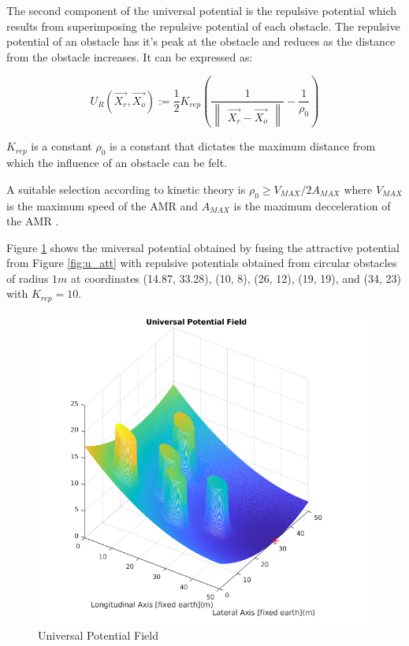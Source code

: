 \documentclass[a4paper, twocolumn]{article}
\begin{document}
The second component of the universal potential is the repulsive potential which results from superimposing 
the repulsive potential of each obstacle. The repulsive potential of an obstacle has it's peak at the obstacle and reduces as the 
distance from the obstacle increases. It can be expressed as:

$$
U_{R}(\vec{X_{r}}, \vec{X_{o}}):= \frac{1}{2} K_{rep} \left( \frac{1}{\begin{Vmatrix}\vec{X_{r}} - \vec{X_{o}}\end{Vmatrix}} 
    - \frac{1}{\rho_{0}} \right)
$$

\noindent
$K_{rep}$ is a constant
$\rho_{0}$ is a constant that dictates the maximum distance from which the influence of an obstacle can be felt.

\noindent
A suitable selection according to kinetic theory is $\rho_{0} \geq V_{MAX}/2 A_{MAX}$ where $V_{MAX}$ is the 
maximum speed of the AMR and $A_{MAX}$ is the maximum decceleration of the AMR \cite{rostami1}.

Figure \ref{fig:u_uni_plot} shows the universal potential obtained by fusing the attractive potential from Figure \ref{fig:u_att} with repulsive 
potentials obtained from circular obstacles of radius $1m$ at coordinates (14.87, 33.28), (10, 8), (26, 12), (19, 19), and (34, 23) 
with $K_{rep}= 10$.


\begin{figure}
    \centering
    \includegraphics[scale=0.45]{presentation/img/u_uni_plot.png}
    \caption{Universal Potential Field}
    \label{fig:u_uni_plot}
\end{figure}
\end{document}
